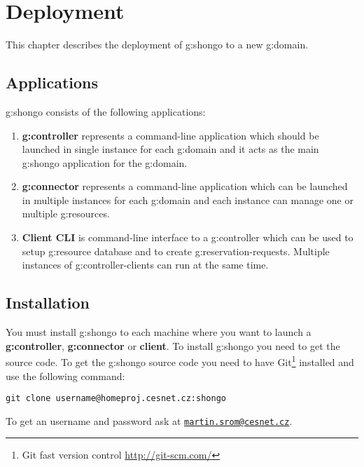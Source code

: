\chapter{Deployment}

This chapter describes the deployment of \gls{g:shongo} to a new \gls{g:domain}.

\section{Applications}

\Gls{g:shongo} consists of the following applications:
\begin{enumerate}
\item \textbf{\Gls{g:controller}} represents a command-line application which should be launched in single instance for each \gls{g:domain} and it acts as the main \gls{g:shongo} application for the \gls{g:domain}.
\item \textbf{\Gls{g:connector}} represents a command-line application which can be launched in multiple instances for each \gls{g:domain} and each instance can manage one or multiple \glspl{g:resource}.
\item \textbf{Client CLI} is command-line interface to a \gls{g:controller} which can be used to setup \gls{g:resource} database and to create \glspl{g:reservation-request}. Multiple instances of \glspl{g:controller-client} can run at the same time.
\end{enumerate}

\section{Installation}

You must install \gls{g:shongo} to each machine where you want to launch a \textbf{\gls{g:controller}}, \textbf{\gls{g:connector}} or \textbf{client}. To install \gls{g:shongo} you need to get the source code. To get the \gls{g:shongo} source code you need to have Git\footnote{Git fast version control \url{http://git-scm.com/}} installed and use the following command:
\begin{verbatim}
git clone username@homeproj.cesnet.cz:shongo
\end{verbatim}
To get an username and password ask at \href{mailto:martin.srom@cesnet.cz}{\texttt{martin.srom@cesnet.cz}}. 

